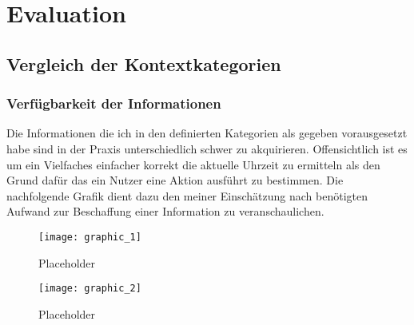 \chapter{Evaluation}%
\label{cha:evaluation}



\section{Vergleich der Kontextkategorien} 
\subsection{Verfügbarkeit der Informationen}
Die Informationen die ich in den definierten Kategorien als gegeben vorausgesetzt habe sind in der Praxis unterschiedlich schwer zu akquirieren. Offensichtlich ist es um ein Vielfaches einfacher korrekt die aktuelle Uhrzeit zu ermitteln als den Grund dafür das ein Nutzer eine Aktion ausführt zu bestimmen. Die nachfolgende Grafik dient dazu den meiner Einschätzung nach benötigten Aufwand zur Beschaffung einer Information zu veranschaulichen.
\begin{figure}[H]
\texttt{[image: graphic\_1]}
\caption{Placeholder}
\label{Placeholder}
\end{figure}
\begin{figure}[H]
\texttt{[image: graphic\_2]}
\caption{Placeholder}
\label{Placeholder}
\end{figure}

